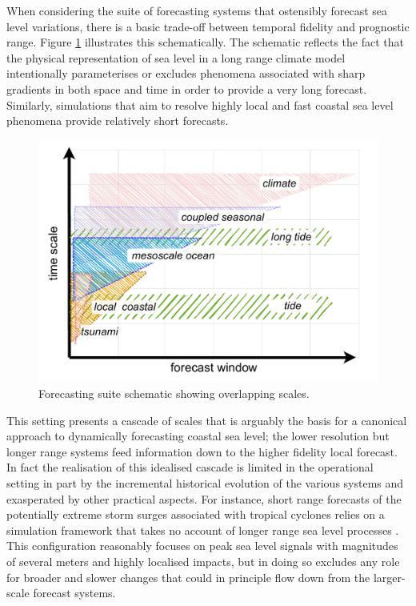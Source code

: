 When considering the suite of forecasting systems that ostensibly forecast sea level variations, there is a basic trade-off between temporal fidelity and prognostic range.    Figure \ref{fig:forecastScalesAll} illustrates this schematically.    The schematic reflects the fact that the physical representation of sea level in a long range climate model intentionally parameterises or excludes phenomena associated with sharp gradients in both space and time in order to provide a very long forecast.  Similarly, simulations that aim to resolve highly local and fast coastal sea level phenomena provide relatively short forecasts.    
\begin{figure}[!hbt]\centering
  \includegraphics[width=\figwidthBig]{figures/diagrams/scales.pdf}
  \caption{Forecasting suite schematic showing overlapping scales.}
  \label{fig:forecastScalesAll}
\end{figure}
This setting presents a cascade of scales that is arguably the basis for a canonical approach to dynamically forecasting coastal sea level; the lower resolution but longer range systems feed information down to the higher fidelity local forecast.    In fact the realisation of this idealised cascade is limited in the operational setting in part by the incremental historical evolution of the various systems and exasperated by other practical aspects.
For instance, short range forecasts of the potentially extreme storm surges associated with tropical cyclones relies on a simulation framework that takes no account of longer range sea level processes \citep{BRR-031}.   This configuration reasonably focuses on peak sea level signals with magnitudes of several meters and highly localised impacts, but in doing so excludes any role for broader and slower changes that could in principle flow down from the larger-scale forecast systems.

